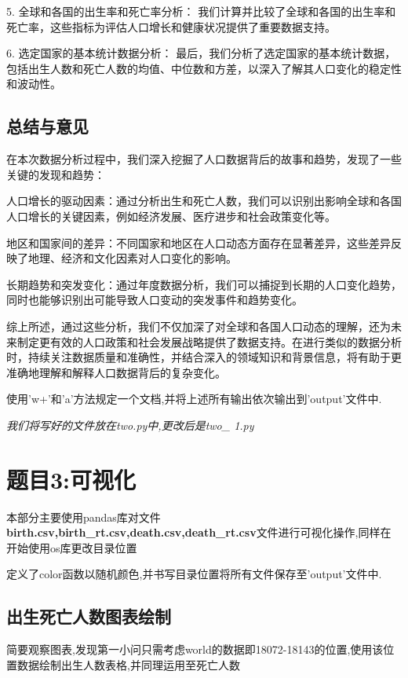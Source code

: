 \documentclass{ctexart}
\begin{document}
    5. 全球和各国的出生率和死亡率分析：
    我们计算并比较了全球和各国的出生率和死亡率，这些指标为评估人口增长和健康状况提供了重要数据支持。
    
    6. 选定国家的基本统计数据分析：
    最后，我们分析了选定国家的基本统计数据，包括出生人数和死亡人数的均值、中位数和方差，以深入了解其人口变化的稳定性和波动性。
    
    \subsection{\textbf{总结与意见}}
    
    \noindent 在本次数据分析过程中，我们深入挖掘了人口数据背后的故事和趋势，发现了一些关键的发现和趋势：\par 
    
    \noindent 人口增长的驱动因素：通过分析出生和死亡人数，我们可以识别出影响全球和各国人口增长的关键因素，例如经济发展、医疗进步和社会政策变化等。\par 
    
    \noindent 地区和国家间的差异：不同国家和地区在人口动态方面存在显著差异，这些差异反映了地理、经济和文化因素对人口变化的影响。\par 
    
    \noindent 长期趋势和突发变化：通过年度数据分析，我们可以捕捉到长期的人口变化趋势，同时也能够识别出可能导致人口变动的突发事件和趋势变化。\par 
    
    \noindent 综上所述，通过这些分析，我们不仅加深了对全球和各国人口动态的理解，还为未来制定更有效的人口政策和社会发展战略提供了数据支持。在进行类似的数据分析时，持续关注数据质量和准确性，并结合深入的领域知识和背景信息，将有助于更准确地理解和解释人口数据背后的复杂变化。
    \par \noindent 使用'w+'和'a'方法规定一个文档,并将上述所有输出依次输出到'output'文件中.
    \par \noindent \emph{我们将写好的文件放在two.py中,更改后是two\_ 1.py}
    
    \section{\textbf{题目3:可视化}}
    \noindent 本部分主要使用pandas库对文件\textbf{birth.csv,birth\_rt.csv,death.csv,death\_rt.csv}文件进行可视化操作,同样在开始使用os库更改目录位置
    \par \noindent 定义了color函数以随机颜色,并书写目录位置将所有文件保存至'output'文件中.
    
    \subsection{\textbf{出生死亡人数图表绘制}}
    \noindent 简要观察图表,发现第一小问只需考虑world的数据即18072-18143的位置,使用该位置数据绘制出生人数表格,并同理运用至死亡人数
\end{document}
